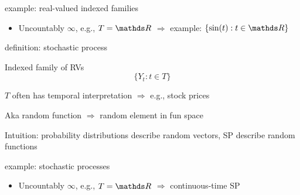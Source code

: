 \documentclass[11pt,compress,t,notes=noshow, xcolor=table]{beamer}
\begin{document}
\begin{frame}{example: real-valued indexed families}
\vfill
\begin{itemize}
\item Uncountably $\infty$, e.g., $T = \R$ $\Rightarrow$ example: $\{\sin(t): t \in \R\}$
\end{itemize}
\end{frame}

\begin{framei}[sep=L]{definition: stochastic process}
\item Indexed family of RVs 
$$\{Y_t: t \in T\}$$ 
\item $T$ often has temporal interpretation $\Rightarrow$ e.g., stock prices
\item Aka random function $\Rightarrow$ random element in fun space
\item Intuition: probability distributions describe random vectors, SP describe random functions
\end{framei}

\begin{frame}{example: stochastic processes}
\vfill
\begin{itemize}
\item Uncountably $\infty$, e.g., $T = \R$ $\Rightarrow$ continuous-time SP
\end{itemize}
\end{frame}
\end{document}
